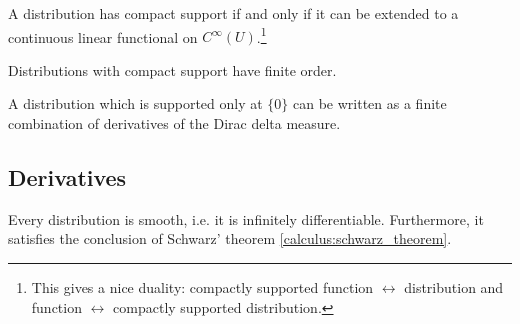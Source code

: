 
	\begin{property}
		A distribution has compact support if and only if it can be extended to a continuous linear functional on $C^\infty(U)$.\footnote{This gives a nice duality: compactly supported function $\leftrightarrow$ distribution and function $\leftrightarrow$ compactly supported distribution.}
	\end{property}

	\begin{property}
		Distributions with compact support have finite order.
	\end{property}

	\begin{property}
		A distribution which is supported only at $\{0\}$ can be written as a finite combination of derivatives of the Dirac delta measure.
	\end{property}

\subsection{Derivatives}


	\begin{property}
		Every distribution is smooth, i.e. it is infinitely differentiable. Furthermore, it satisfies the conclusion of Schwarz' theorem \ref{calculus:schwarz_theorem}.
	\end{property}


